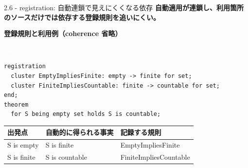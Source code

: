 \documentclass[dvipdfmx,aspectratio=169,11pt]{beamer}
\newcommand{\statusbadge}[2]{\colorbox{#1}{\textcolor{white}{\strut\scriptsize\sffamily\bfseries #2}}}
\newcommand{\badgeSketch}{\statusbadge{orange!75!black}{sketch}}
\begin{document}
\begin{frame}[fragile,t]{2.6 - registration: 自動連鎖で見えにくくなる依存}
\textcolor{blue!55!black}{\textbf{自動適用が連鎖し、利用箇所のソースだけでは依存する登録規則を追いにくい。}}

\smallskip
\textbf{登録規則と利用例（coherence 省略）}~\badgeSketch
\begin{lstlisting}[language={mizar},basicstyle=\ttfamily\small]
registration
  cluster EmptyImpliesFinite: empty -> finite for set;
  cluster FiniteImpliesCountable: finite -> countable for set;
end;
theorem
  for S being empty set holds S is countable;
\end{lstlisting}
\par{}
\begin{footnotesize}
\setlength{\tabcolsep}{3pt}
\renewcommand{\arraystretch}{1.15}
\begin{tabular}{lll}
\toprule
\textbf{出発点} & \textbf{自動的に得られる事実} & \textbf{記録する規則} \\
\midrule
S is empty & S is finite & EmptyImpliesFinite \\
S is finite & S is countable & FiniteImpliesCountable \\
\bottomrule
\end{tabular}
\end{footnotesize}


\end{frame}
\end{document}
